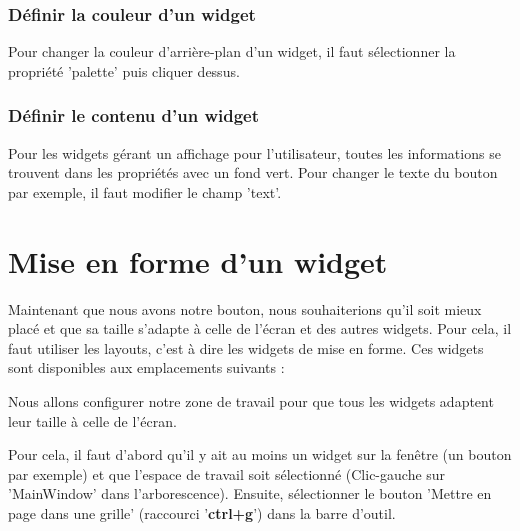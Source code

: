 \documentclass[12pt]{report}    %
\begin{document}


\subsubsection{Définir la couleur d'un widget}
Pour changer la couleur d'arrière-plan d'un widget, il faut sélectionner la propriété 'palette' puis cliquer dessus.



\subsubsection{Définir le contenu d'un widget}
Pour les widgets gérant un affichage pour l'utilisateur, toutes les informations se trouvent dans les propriétés avec un fond vert.\newline
Pour changer le texte du bouton par exemple, il faut modifier le champ 'text'.\newline



\section{Mise en forme d'un widget}

Maintenant que nous avons notre bouton, nous souhaiterions qu'il soit mieux placé et que sa taille s'adapte à celle de l'écran et des autres widgets. Pour cela, il faut utiliser les layouts, c'est à dire les widgets de mise en forme.
Ces widgets sont disponibles aux emplacements suivants : \newline



Nous allons configurer notre zone de travail pour que tous les widgets adaptent leur taille à celle de l'écran.

Pour cela, il faut  d'abord qu'il y ait au moins un widget sur la fenêtre (un bouton par exemple) et que l'espace de travail soit sélectionné (Clic-gauche sur 'MainWindow' dans l'arborescence). \newline
Ensuite, sélectionner le bouton 'Mettre en page dans une grille' (raccourci '\textbf{ctrl+g}') dans la barre d'outil.
\end{document}
